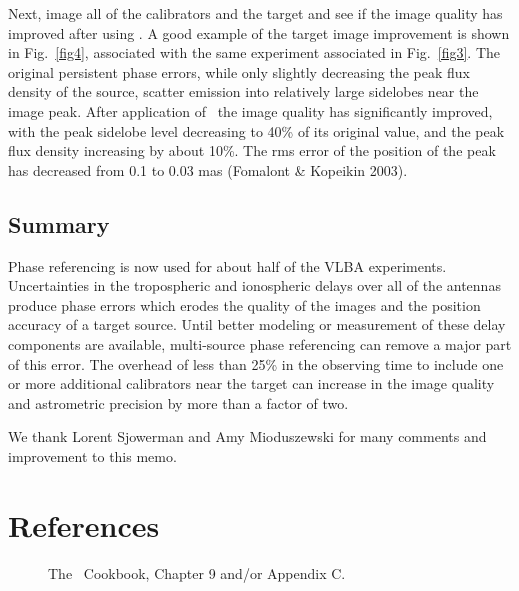 {     Next, image all of the calibrators and the target and see if the
image quality has improved after using \ATMCA.  A good example of the
target image improvement is shown in Fig.~\ref{fig4}, associated with
the same experiment associated in Fig.~\ref{fig3}.  The original
persistent phase errors, while only slightly decreasing the peak flux
density of the source, scatter emission into relatively large
sidelobes near the image peak.  After application of \ATMCA~the image
quality has significantly improved, with the peak sidelobe level
decreasing to 40\% of its original value, and the peak flux density
increasing by about 10\%.  The rms error of the position of the peak
has decreased from 0.1 to 0.03 mas (Fomalont \& Kopeikin 2003).

\subsection {Summary}

    Phase referencing is now used for about half of the VLBA
experiments.  Uncertainties in the tropospheric and ionospheric delays
over all of the antennas produce phase errors which erodes the quality
of the images and the position accuracy of a target source.  Until
better modeling or measurement of these delay components are
available, multi-source phase referencing can remove a major part of
this error.  The overhead of less than 25\% in the observing time to
include one or more additional calibrators near the target can
increase in the image quality and astrometric precision by more than a
factor of two.

    We thank Lorent Sjowerman and Amy Mioduszewski for many comments
and improvement to this memo.

\section{References}

\begin{description}
\item []The \AIPS\ Cookbook, Chapter 9 and/or Appendix C.


\end{description}}
